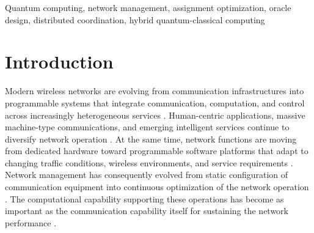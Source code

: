 \documentclass[journal]{IEEEtran}
\begin{document}
{\begin{abstract}
\end{abstract}
\begin{IEEEkeywords}
Quantum computing, network management, assignment optimization, oracle design, distributed coordination, hybrid quantum-classical computing
\end{IEEEkeywords}
\section{Introduction}
\label{sec:intro}
Modern wireless networks are evolving from communication infrastructures into programmable systems that integrate communication, computation, and control across increasingly heterogeneous services \cite{1}. Human-centric applications, massive machine-type communications, and emerging intelligent services continue to diversify network operation \cite{1,2}. At the same time, network functions are moving from dedicated hardware toward programmable software platforms that adapt to changing traffic conditions, wireless environments, and service requirements \cite{2,3}. Network management has consequently evolved from static configuration of communication equipment into continuous optimization of the network operation \cite{2,4}. The computational capability supporting these operations has become as important as the communication capability itself for sustaining the network performance \cite{1,4}.

}
\end{document}
